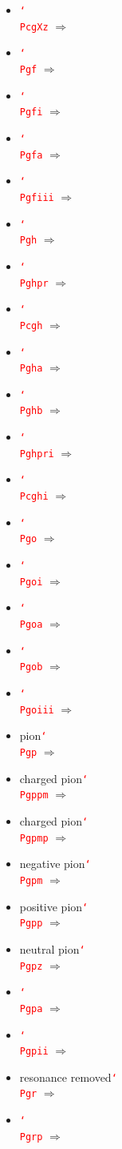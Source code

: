 \documentclass[12pt]{article}
\newcommand{\texcmd}[1]{\textcolor{red}{\texttt{\char`\\#1}}}
\begin{document}
\begin{multicols}{2}
{\begin{itemize}
\item  \texcmd{PcgXz} $\Rightarrow$ \PcgXz
\item  \texcmd{Pgf} $\Rightarrow$ \Pgf
\item  \texcmd{Pgfi} $\Rightarrow$ \Pgfi
\item  \texcmd{Pgfa} $\Rightarrow$ \Pgfa
\item  \texcmd{Pgfiii} $\Rightarrow$ \Pgfiii
\item  \texcmd{Pgh} $\Rightarrow$ \Pgh
\item  \texcmd{Pghpr} $\Rightarrow$ \Pghpr
\item  \texcmd{Pcgh} $\Rightarrow$ \Pcgh
\item  \texcmd{Pgha} $\Rightarrow$ \Pgha
\item  \texcmd{Pghb} $\Rightarrow$ \Pghb
\item  \texcmd{Pghpri} $\Rightarrow$ \Pghpri
\item  \texcmd{Pcghi} $\Rightarrow$ \Pcghi
\item  \texcmd{Pgo} $\Rightarrow$ \Pgo
\item  \texcmd{Pgoi} $\Rightarrow$ \Pgoi
\item  \texcmd{Pgoa} $\Rightarrow$ \Pgoa
\item  \texcmd{Pgob} $\Rightarrow$ \Pgob
\item  \texcmd{Pgoiii} $\Rightarrow$ \Pgoiii
\item pion\newline \texcmd{Pgp} $\Rightarrow$ \Pgp
\item charged pion\newline \texcmd{Pgppm} $\Rightarrow$ \Pgppm
\item charged pion\newline \texcmd{Pgpmp} $\Rightarrow$ \Pgpmp
\item negative pion\newline \texcmd{Pgpm} $\Rightarrow$ \Pgpm
\item positive pion\newline \texcmd{Pgpp} $\Rightarrow$ \Pgpp
\item neutral pion\newline \texcmd{Pgpz} $\Rightarrow$ \Pgpz
\item  \texcmd{Pgpa} $\Rightarrow$ \Pgpa
\item  \texcmd{Pgpii} $\Rightarrow$ \Pgpii
\item resonance removed\newline \texcmd{Pgr} $\Rightarrow$ \Pgr
\item  \texcmd{Pgrp} $\Rightarrow$ \Pgrp

\end{itemize}}
\end{multicols}
\end{document}

